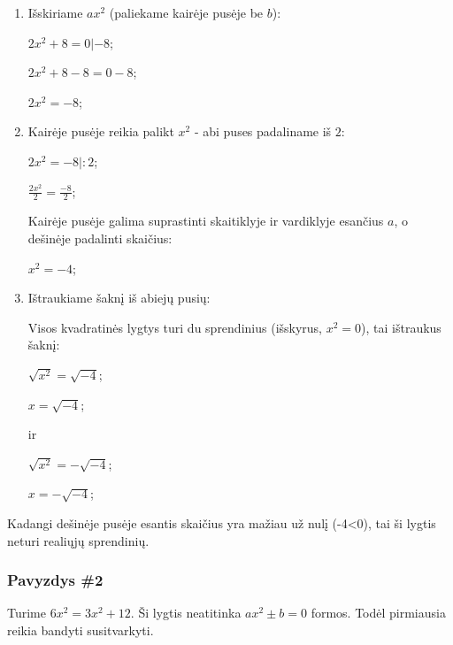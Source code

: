 \documentclass[a4paper]{article}
\begin{document}
\begin{enumerate}
    \item  Išskiriame $ ax^{2} $ (paliekame kairėje pusėje be $ b $):

    $ 2x^{2}+8=0 | -8 $;
    
    $ 2x^{2}+8-8=0-8 $;
    
    $ 2x^{2}=-8 $;

    \item Kairėje pusėje reikia palikt $ x^2 $ - abi puses padaliname iš $ 2 $:

    $ 2x^{2}=-8 |:2 $;

    $ \frac{2x^{2}}{2}=\frac{-8}{2}$;

    Kairėje pusėje galima suprastinti skaitiklyje ir vardiklyje esančius $ a $, o dešinėje padalinti skaičius:

    $ x^{2}=-4$;

    \item Ištraukiame šaknį iš abiejų pusių:
    
    Visos kvadratinės lygtys turi du sprendinius (išskyrus, $ x^2=0 $), tai ištraukus šaknį:
    
    $ \sqrt{x^{2}}=\sqrt{-4}$;

    $ x=\sqrt{-4}$;

    ir 

    $ \sqrt{x^{2}}=-\sqrt{-4}$;

    $ x=-\sqrt{-4}$;

\end{enumerate}

Kadangi dešinėje pusėje esantis skaičius yra mažiau už nulį (-4<0), tai ši lygtis neturi realiųjų sprendinių.

\subsubsection{Pavyzdys \#2}

Turime $ 6x^{2}=3x^{2}+12 $. Ši lygtis neatitinka $ ax^{2}\pm b=0 $ formos. Todėl pirmiausia reikia bandyti susitvarkyti.
\end{document}

